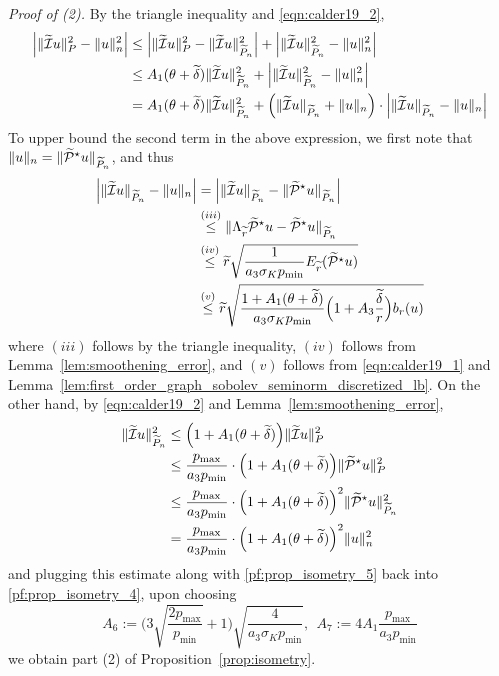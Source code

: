 \textit{Proof of (2).}
By the triangle inequality and \eqref{eqn:calder19_2},
\begin{align}
\Bigl|\|\widetilde{\mathcal{I}}u\|_{P}^2 - \|u\|_{n}^2\Bigr| & \leq \Bigl|\|\widetilde{\mathcal{I}}u\|_{P}^2 - \|\widetilde{\mathcal{I}}u\|_{\widetilde{P}_n}^2\Bigr| + \Bigl|\|\widetilde{\mathcal{I}}u\|_{\widetilde{P}_n}^2 - \|u\|_{n}^2\Bigr| \nonumber \\
& \leq A_1(\theta + \widetilde{\delta}) \|\widetilde{\mathcal{I}}u\|_{\widetilde{P}_n}^2 + \Bigl|\|\widetilde{\mathcal{I}}u\|_{\widetilde{P}_n}^2 - \|u\|_{n}^2\Bigr| \nonumber\\
& = A_1(\theta + \widetilde{\delta}) \|\widetilde{\mathcal{I}}u\|_{\widetilde{P}_n}^2 + \Bigl(\|\widetilde{\mathcal{I}}u\|_{\widetilde{P}_n} + \|u\|_{n}\Bigr) \cdot \Bigl|\|\widetilde{\mathcal{I}}u\|_{\widetilde{P}_n} - \|u\|_{n}\Bigr| \label{pf:prop_isometry_4}
\end{align}
To upper bound the second term in the above expression, we first note that~$\|u\|_{n} = \|\widetilde{\mathcal{P}}^{\star}u\|_{\widetilde{P}_n}$, and thus
\begin{align}
\Bigl|\|\widetilde{\mathcal{I}}u\|_{\widetilde{P}_n} - \|u\|_{n} \Bigr| & = \Bigl|\|\widetilde{\mathcal{I}}u\|_{\widetilde{P}_n} - \|\widetilde{\mathcal{P}}^{\star}u\|_{\widetilde{P}_n}\Bigr| \nonumber \\
& \overset{(iii)}{\leq} \|\Lambda_{\widetilde{r}}\widetilde{\mathcal{P}}^{\star}u - \widetilde{\mathcal{P}}^{\star}u\|_{\widetilde{P}_n} \nonumber \\
& \overset{(iv)}{\leq} \widetilde{r} \sqrt{\frac{1}{a_3\sigma_K p_{\min}} E_{\widetilde{r}}(\widetilde{\mathcal{P}}^{\star}u)} \nonumber \\
& \overset{(v)}{\leq} \widetilde{r} \sqrt{\frac{1 + A_1(\theta + \widetilde{\delta})}{a_3\sigma_K p_{\min}} \Bigl(1 + A_3\frac{\widetilde{\delta}}{r}\Bigr) b_r(u)} \label{pf:prop_isometry_5}
\end{align}
where $(iii)$ follows by the triangle inequality, $(iv)$ follows from Lemma~\ref{lem:smoothening_error}, and $(v)$ follows from \eqref{eqn:calder19_1} and Lemma~\ref{lem:first_order_graph_sobolev_seminorm_discretized_lb}. On the other hand, by \eqref{eqn:calder19_2} and Lemma~\ref{lem:smoothening_error},
\begin{align*}
\|\widetilde{\mathcal{I}}u\|_{\widetilde{P}_n}^2 & \leq \Bigl(1 + A_1(\theta + \widetilde{\delta})\Bigr) \|\widetilde{\mathcal{I}}u\|_{P}^2 \\
& \leq \frac{p_{\max}}{a_3p_{\min}} \cdot \Bigl(1 + A_1(\theta + \widetilde{\delta})\Bigr) \|\widetilde{\mathcal{P}}^{\star}u\|_{P}^2 \\
& \leq \frac{p_{\max}}{a_3p_{\min}} \cdot \Bigl(1 + A_1(\theta + \widetilde{\delta})\Bigr)^2 \|\widetilde{\mathcal{P}}^{\star}u\|_{\widetilde{P}_n}^2 \\
& = \frac{p_{\max}}{a_3p_{\min}} \cdot \Bigl(1 + A_1(\theta + \widetilde{\delta})\Bigr)^2 \|u\|_{n}^2
\end{align*}
and plugging this estimate along with \eqref{pf:prop_isometry_5} back into \eqref{pf:prop_isometry_4}, upon choosing
\begin{equation*}
A_6 := \biggl(3\sqrt{\frac{2p_{\max}}{p_{\min}}} + 1\biggr)\sqrt{\frac{4}{a_3\sigma_Kp_{\min}}},~~A_7:=4A_1\frac{p_{\max}}{a_3p_{\min}}
\end{equation*}
we obtain part (2) of Proposition~\ref{prop:isometry}.

